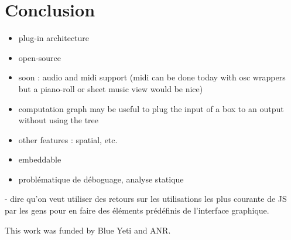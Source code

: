 \documentclass{article}
\begin{document}
\section{Conclusion}
\begin{itemize}
\item plug-in architecture
\item open-source
\item soon : audio and midi support (midi can be done today with osc wrappers but a piano-roll or sheet music view would be nice)
\item computation graph may be useful to plug the input of a box  to an output without using the tree
\item other features : spatial, etc.
\item embeddable 
\item problématique de déboguage, analyse statique
\end{itemize}
- dire qu'on veut utiliser des retours sur les utilisations 
les plus courante de JS par les gens pour en faire des éléments 
prédéfinis de l'interface graphique.
\begin{acknowledgments}
    This work was funded by Blue Yeti and ANR.
\end{acknowledgments} 


\end{document}
